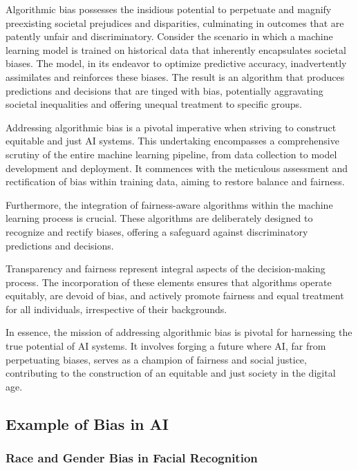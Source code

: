 \documentclass[12pt,a4paper,openright,twoside]{book}
\begin{document}
Algorithmic bias possesses the insidious potential to perpetuate and magnify preexisting societal prejudices and disparities, culminating in outcomes that are patently unfair and discriminatory. Consider the scenario in which a machine learning model is trained on historical data that inherently encapsulates societal biases. The model, in its endeavor to optimize predictive accuracy, inadvertently assimilates and reinforces these biases. The result is an algorithm that produces predictions and decisions that are tinged with bias, potentially aggravating societal inequalities and offering unequal treatment to specific groups. \cite{10.1145/2983270} 

Addressing algorithmic bias is a pivotal imperative when striving to construct equitable and just AI systems. This undertaking encompasses a comprehensive scrutiny of the entire machine learning pipeline, from data collection to model development and deployment. It commences with the meticulous assessment and rectification of bias within training data, aiming to restore balance and fairness. 

Furthermore, the integration of fairness-aware algorithms within the machine learning process is crucial. These algorithms are deliberately designed to recognize and rectify biases, offering a safeguard against discriminatory predictions and decisions. 

Transparency and fairness represent integral aspects of the decision-making process. The incorporation of these elements ensures that algorithms operate equitably, are devoid of bias, and actively promote fairness and equal treatment for all individuals, irrespective of their backgrounds. 

In essence, the mission of addressing algorithmic bias is pivotal for harnessing the true potential of AI systems. It involves forging a future where AI, far from perpetuating biases, serves as a champion of fairness and social justice, contributing to the construction of an equitable and just society in the digital age.


\subsection{Example of Bias in AI}

\subsubsection{Race and Gender Bias in Facial Recognition} 
\end{document}
